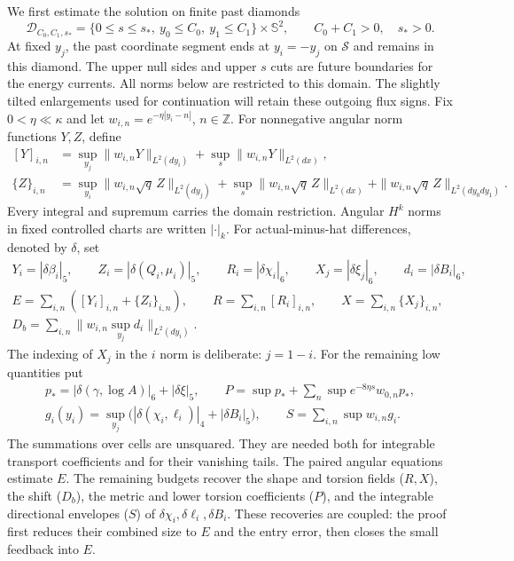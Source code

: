We first estimate the solution on finite past diamonds
\[
 \mathcal D_{C_0,C_1,s_*}
 =\{0\le s\le s_*,\ y_0\le C_0,\ y_1\le C_1\}
       \times\mathbb S^2,
 \qquad C_0+C_1>0,\quad s_*>0.
\]
At fixed $y_j$, the past coordinate segment ends at $y_i=-y_j$
on $\mathcal S$ and remains in this diamond. The upper null sides and
upper $s$ cuts are future boundaries for the energy currents. All norms
below are restricted to this domain. The slightly tilted enlargements
used for continuation will retain these outgoing flux signs.
Fix $0<\eta\ll\kappa$ and let
$w_{i,n}=e^{-\eta|y_i-n|}$, $n\in\mathbb Z$.
For nonnegative angular norm functions $Y,Z$, define
\begin{equation}\label{in:flux-norms}
\begin{aligned}
 [Y]_{i,n}
   &=\sup_{y_j}\|w_{i,n}Y\|_{L^2(dy_i)}
       +\sup_s\|w_{i,n}Y\|_{L^2(dx)},\\
 \{Z\}_{i,n}
   &=\sup_{y_i}\|w_{i,n}\sqrt q\,Z\|_{L^2(dy_j)}
       +\sup_s\|w_{i,n}\sqrt q\,Z\|_{L^2(dx)}
       +\|w_{i,n}\sqrt q\,Z\|_{L^2(dy_0dy_1)}.
\end{aligned}
\end{equation}
Every integral and supremum carries the domain restriction. Angular
$H^k$ norms in fixed controlled charts are written $|\cdot|_k$.
For actual-minus-hat differences, denoted by $\delta$, set
\begin{equation}\label{in:low-variables}
\begin{gathered}
 Y_i=|\delta\beta_i|_5,\qquad
 Z_i=|\delta(Q_i,\mu_i)|_5,\qquad
 R_i=|\delta\chi_i|_6,\qquad
 X_j=|\delta\xi_j|_6,\qquad d_i=|\delta B_i|_6,\\
 E=\sum_{i,n}([Y_i]_{i,n}+\{Z_i\}_{i,n}),\qquad
 R=\sum_{i,n}[R_i]_{i,n},\qquad
 X=\sum_{i,n}\{X_j\}_{i,n},\\
 D_b=\sum_{i,n}
        \|w_{i,n}\sup_{y_j}d_i\|_{L^2(dy_i)}.
\end{gathered}
\end{equation}
The indexing of $X_j$ in the $i$ norm is deliberate: $j=1-i$.
For the remaining low quantities put
\begin{equation}\label{in:low-point-budgets}
\begin{gathered}
 p_*=|\delta(\gamma,\log A)|_6+|\delta\xi|_5,\qquad
 P=\sup p_*+\sum_n\sup e^{-8\eta s}w_{0,n}p_*,\\
 g_i(y_i)=\sup_{y_j}
    \bigl(|\delta(\chi_i,\ell_i)|_4+|\delta B_i|_5\bigr),
 \qquad S=\sum_{i,n}\sup w_{i,n}g_i.
\end{gathered}
\end{equation}
The summations over cells are unsquared. They are needed both for
integrable transport coefficients and for their vanishing tails.
The paired angular equations estimate $E$. The remaining budgets
recover the shape and torsion fields ($R,X$), the shift ($D_b$),
the metric and lower torsion coefficients ($P$), and the integrable
directional envelopes ($S$) of $\delta\chi_i,\delta\ell_i,\delta B_i$.
These recoveries are coupled: the proof first reduces
their combined size to $E$ and the entry error, then closes the small
feedback into $E$.

